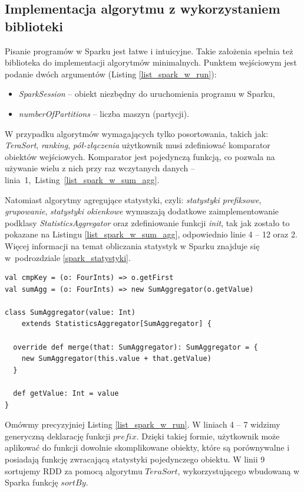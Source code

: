 \documentclass[magisterska]{pracamgr}
\begin{document}
\subsection{Implementacja algorytmu z wykorzystaniem biblioteki}

Pisanie programów w Sparku jest łatwe i intuicyjne. Takie założenia spełnia też biblioteka do implementacji algorytmów minimalnych. Punktem wejściowym jest podanie dwóch argumentów (Listing \ref{list_spark_w_run}):
\begin{itemize}
    \item \textit{SparkSession} -- obiekt niezbędny do uruchomienia programu w Sparku,
    \item \textit{numberOfPartitions} -- liczba maszyn (partycji).
\end{itemize}

W przypadku algorytmów wymagających tylko posortowania, takich jak: \textit{TeraSort}, \textit{ranking}, \textit{pół-złączenia} użytkownik musi zdefiniować komparator obiektów wejściowych. Komparator jest pojedynczą funkcją, co pozwala na używanie wielu z nich przy raz wczytanych danych -- \mbox{linia 1, Listing \ref{list_spark_w_sum_agg}}.

Natomiast algorytmy agregujące statystyki, czyli: \textit{statystyki prefiksowe}, \textit{grupowanie}, \textit{statystyki okienkowe} wymuszają dodatkowe zaimplementowanie podklasy \textit{StatisticsAggregator} oraz zdefiniowanie funkcji \textit{init}, tak jak zostało to pokazane na Listingu \ref{list_spark_w_sum_agg}, odpowiednio linie 4 -- 12 oraz 2. Więcej informacji na temat obliczania statystyk w Sparku znajduje się w~podrozdziale \ref{spark_statystyki}.

\newpage
\begin{lstlisting}[language=SmallJava,firstnumber=1,label=list_spark_w_sum_agg,caption=Funkcja porównująca oraz funkcja statystyk]
val cmpKey = (o: FourInts) => o.getFirst
val sumAgg = (o: FourInts) => new SumAggregator(o.getValue)

class SumAggregator(value: Int)
    extends StatisticsAggregator[SumAggregator] {
    
  override def merge(that: SumAggregator): SumAggregator = {
    new SumAggregator(this.value + that.getValue)
  }
  
  def getValue: Int = value
}
\end{lstlisting}

Omówmy precyzyjniej Listing \ref{list_spark_w_run}. W liniach 4 -- 7 widzimy generyczną deklarację funkcji \(prefix\). Dzięki takiej formie, użytkownik może aplikować do funkcji dowolnie skomplikowane obiekty, które są porównywalne i posiadają funkcję zwracającą statystyki pojedynczego obiektu. W linii 9 sortujemy RDD za pomocą algorytmu \(TeraSort\), wykorzystującego wbudowaną w Sparka funkcję \(sortBy\).
\end{document}
